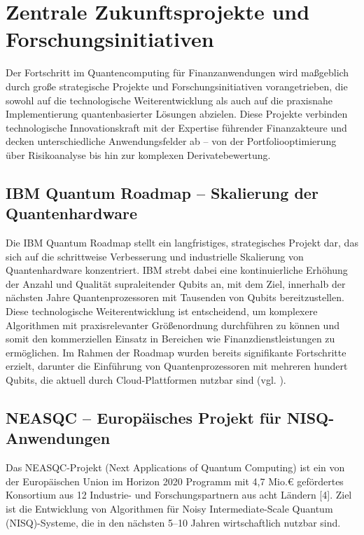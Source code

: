 \section{Zentrale Zukunftsprojekte und Forschungsinitiativen}

Der Fortschritt im Quantencomputing für Finanzanwendungen wird maßgeblich durch große strategische Projekte und Forschungsinitiativen vorangetrieben, die sowohl auf die technologische Weiterentwicklung als auch auf die praxisnahe Implementierung quantenbasierter Lösungen abzielen. Diese Projekte verbinden technologische Innovationskraft mit der Expertise führender Finanzakteure und decken unterschiedliche Anwendungsfelder ab – von der Portfoliooptimierung über Risikoanalyse bis hin zur komplexen Derivatebewertung.

\subsection{IBM Quantum Roadmap – Skalierung der Quantenhardware}

Die IBM Quantum Roadmap stellt ein langfristiges, strategisches Projekt dar, das sich auf die schrittweise Verbesserung und industrielle Skalierung von Quantenhardware konzentriert. IBM strebt dabei eine kontinuierliche Erhöhung der Anzahl und Qualität supraleitender Qubits an, mit dem Ziel, innerhalb der nächsten Jahre Quantenprozessoren mit Tausenden von Qubits bereitzustellen. Diese technologische Weiterentwicklung ist entscheidend, um komplexere Algorithmen mit praxisrelevanter Größenordnung durchführen zu können und somit den kommerziellen Einsatz in Bereichen wie Finanzdienstleistungen zu ermöglichen. Im Rahmen der Roadmap wurden bereits signifikante Fortschritte erzielt, darunter die Einführung von Quantenprozessoren mit mehreren hundert Qubits, die aktuell durch Cloud-Plattformen nutzbar sind (vgl. \cite{ibminstituteforbusinessvalueQuantumDecade2023}).

\subsection{NEASQC – Europäisches Projekt für NISQ-Anwendungen}

Das NEASQC-Projekt (Next Applications of Quantum Computing) ist ein von der Europäischen Union im Horizon 2020 Programm mit 4,7 Mio.€ gefördertes Konsortium aus 12 Industrie- und Forschungspartnern aus acht Ländern [4]. Ziel ist die Entwicklung von Algorithmen für Noisy Intermediate-Scale Quantum (NISQ)-Systeme, die in den nächsten 5–10 Jahren wirtschaftlich nutzbar sind.

